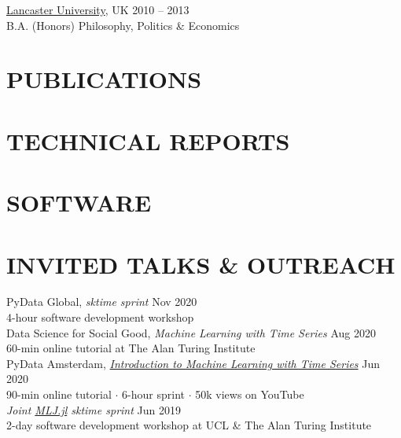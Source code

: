 \documentclass{cv}
\newcommand{\printbibsection}[2]{
\begin{refsection}
\nocite{*}
\printbibliography[sorting=chronological,
                  type={#1},
                  title={#2},
                  heading=none]
\end{refsection}
}
\begin{document}
\href{https://www.lancs.ac.uk/}{Lancaster University}, UK \hfill 2010 -- 2013 \\
B.A. (Honors) Philosophy, Politics \& Economics

\section{PUBLICATIONS}
\printbibsection{article}{}

\section{TECHNICAL REPORTS}
\printbibsection{proceedings}{}

\section{SOFTWARE}
\printbibsection{misc}{}

\section{INVITED TALKS \& OUTREACH}

PyData Global, \textit{sktime sprint} \hfill Nov 2020 \\
{\color{lightgray} 4-hour software development workshop} \\

Data Science for Social Good, \textit{Machine Learning with Time Series} \hfill Aug 2020 \\
{\color{lightgray} 60-min online tutorial at The Alan Turing Institute} \\

PyData Amsterdam, \href{https://www.youtube.com/watch?v=wqQKFu41FIw}{\textit{Introduction to Machine Learning with Time Series}} \hfill Jun 2020 \\
{\color{lightgray} 90-min online tutorial $\cdot$ 6-hour sprint $\cdot$ 50k views on YouTube} \\

\textit{Joint \href{https://github.com/alan-turing-institute/MLJ.jl}{MLJ.jl} sktime sprint} \hfill Jun 2019 \\
{\color{lightgray} 2-day software development workshop at UCL \& The Alan Turing Institute} \\
\end{document}
